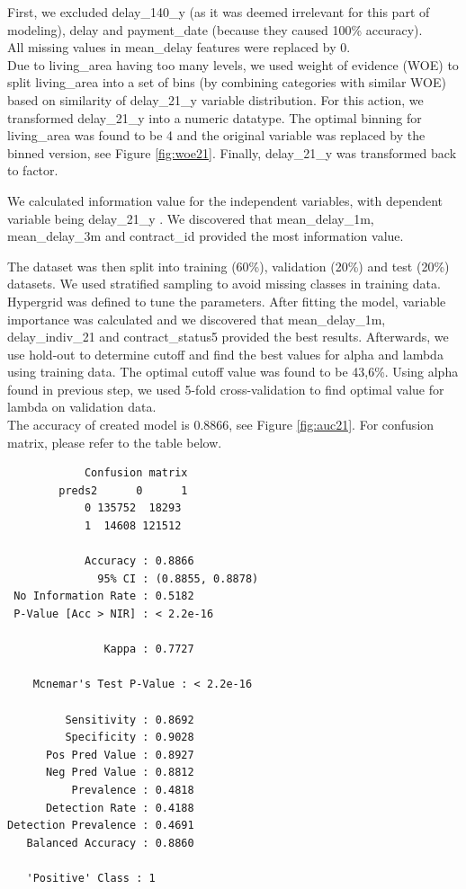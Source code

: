 \documentclass[
]{article}
\begin{document}
First, we excluded delay\_140\_y (as it was deemed irrelevant for this part of modeling), delay and payment\_date (because they caused 100\% accuracy).\\
All missing values in mean\_delay features were replaced by 0.\\
Due to living\_area having too many levels, we used weight of evidence (WOE) to split living\_area into a set of bins (by combining categories with similar WOE) based on similarity of delay\_21\_y variable distribution. For this action, we transformed delay\_21\_y into a numeric datatype. The optimal binning for living\_area was found to be 4 and the original variable was replaced by the binned version, see Figure \ref{fig:woe21}. Finally, delay\_21\_y was transformed back to factor.

We calculated information value for the independent variables, with dependent variable being delay\_21\_y . We discovered that mean\_delay\_1m, mean\_delay\_3m and contract\_id provided the most information value.

The dataset was then split into training (60\%), validation (20\%) and test (20\%) datasets. We used stratified sampling to avoid missing classes in training data.
Hypergrid was defined to tune the parameters. After fitting the model, variable importance was calculated and we discovered that mean\_delay\_1m, delay\_indiv\_21 and contract\_status5 provided the best results.
Afterwards, we use hold-out to determine cutoff and find the best values for alpha and lambda using training data. The optimal cutoff value was found to be 43,6\%. Using alpha found in previous step, we used 5-fold cross-validation to find optimal value for lambda on validation data.\\
The accuracy of created model is 0.8866, see Figure \ref{fig:auc21}. For confusion matrix, please refer to the table below.

\begin{verbatim}
            Confusion matrix
        preds2      0      1
            0 135752  18293
            1  14608 121512
                                      
            Accuracy : 0.8866          
              95% CI : (0.8855, 0.8878)
 No Information Rate : 0.5182          
 P-Value [Acc > NIR] : < 2.2e-16       
                                      
               Kappa : 0.7727        
                                      
    Mcnemar's Test P-Value : < 2.2e-16       
                                      
         Sensitivity : 0.8692          
         Specificity : 0.9028          
      Pos Pred Value : 0.8927          
      Neg Pred Value : 0.8812          
          Prevalence : 0.4818          
      Detection Rate : 0.4188          
Detection Prevalence : 0.4691          
   Balanced Accuracy : 0.8860          
                                      
   'Positive' Class : 1
\end{verbatim}
\end{document}
